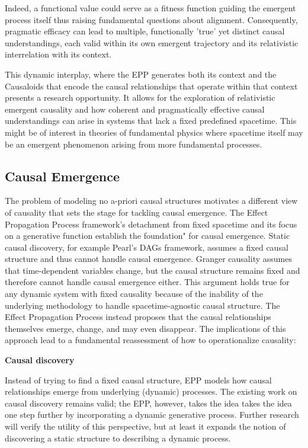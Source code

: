 Indeed, a functional value could serve as a fitness function guiding the emergent process itself thus raising fundamental questions about alignment. Consequently, pragmatic efficacy can lead to multiple, functionally 'true' yet distinct causal understandings, each valid within its own emergent trajectory and its relativistic interrelation with its context.

This dynamic interplay, where the EPP generates both its context and the Causaloids that encode the causal relationships that operate within that context presents a research opportunity. It allows for the exploration of relativistic emergent causality and how coherent and pragmatically effective causal understandings can arise in systems that lack a fixed predefined spacetime. This might be of interest in theories of fundamental physics where spacetime itself may be an emergent phenomenon arising from more fundamental processes.

\subsection{Causal Emergence}
\label{sec:causal_emergence}

The problem of modeling no a-priori causal structures motivates a different view of causality that sets the stage for tackling  causal emergence. The Effect Propagation Process framework's detachment from fixed spacetime and its focus on a generative function establish the foundation" for causal emergence. Static causal discovery, for example Pearl’s DAGs framework, assumes a fixed causal structure and thus cannot handle causal emergence. Granger causality assumes that time-dependent variables change, but the causal structure remains fixed and therefore cannot handle causal emergence either. This argument holds true for any dynamic system with fixed causality because of the inability of the underlying methodology to handle spacetime-agnostic causal structure. The Effect Propagation Process instead proposes that the causal relationships themselves emerge, change, and may even disappear. The implications of this approach lead to a fundamental reassessment of how to operationalize causality:

\textbf{Causal discovery}

Instead of trying to find a fixed causal structure, EPP models how causal relationships emerge from underlying (dynamic) processes. The existing work on causal discovery remains valid; the EPP, however, takes the idea takes the idea one step further by incorporating a dynamic generative process. Further research will verify the utility of this perspective, but at least it expands the notion of discovering a static structure to describing a dynamic process.

